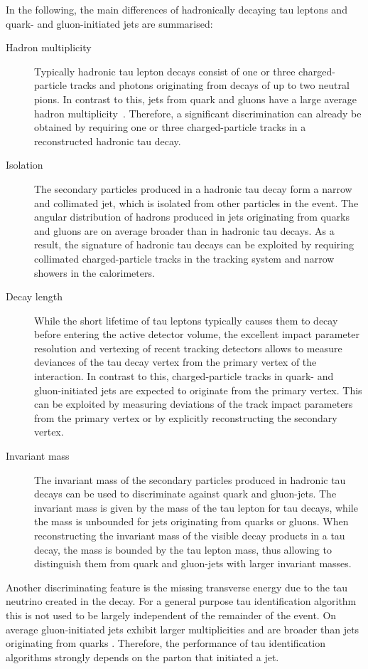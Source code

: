 In the following, the main differences of hadronically decaying tau leptons and
quark- and gluon-initiated jets are summarised:
\begin{description}
\item[Hadron multiplicity] Typically hadronic tau lepton decays consist of one
  or three charged-particle tracks and photons originating from decays of up to
  two neutral pions. In contrast to this, jets from quark and gluons have a
  large average hadron multiplicity~\cite{ellis_stirling_webber}. Therefore, a
  significant discrimination can already be obtained by requiring one or three
  charged-particle tracks in a reconstructed hadronic tau decay.

\item[Isolation] The secondary particles produced in a hadronic tau decay form a
  narrow and collimated jet, which is isolated from other particles in the
  event. The angular distribution of hadrons produced in jets originating from
  quarks and gluons are on average broader than in hadronic tau decays. As a
  result, the signature of hadronic tau decays can be exploited by requiring
  collimated charged-particle tracks in the tracking system and narrow showers
  in the calorimeters.

\item[Decay length] While the short lifetime of tau leptons typically causes
  them to decay before entering the active detector volume, the excellent impact
  parameter resolution and vertexing of recent tracking detectors allows to
  measure deviances of the tau decay vertex from the primary vertex of the
  interaction. In contrast to this, charged-particle tracks in quark- and
  gluon-initiated jets are expected to originate from the primary vertex. This
  can be exploited by measuring deviations of the track impact parameters from
  the primary vertex or by explicitly reconstructing the secondary vertex.

\item[Invariant mass] The invariant mass of the secondary particles produced in
  hadronic tau decays can be used to discriminate against quark and gluon-jets.
  The invariant mass is given by the mass of the tau lepton for tau decays,
  while the mass is unbounded for jets originating from quarks or gluons. When
  reconstructing the invariant mass of the visible decay products in a tau
  decay, the mass is bounded by the tau lepton mass, thus allowing to
  distinguish them from quark and gluon-jets with larger invariant masses.

\end{description}
Another discriminating feature is the missing transverse energy due to the tau
neutrino created in the decay. For a general purpose tau identification
algorithm this is not used to be largely independent of the remainder of the
event. On average gluon-initiated jets exhibit larger multiplicities and are
broader than jets originating from quarks \cite{ellis_stirling_webber}.
Therefore, the performance of tau identification algorithms strongly depends on
the parton that initiated a jet.

